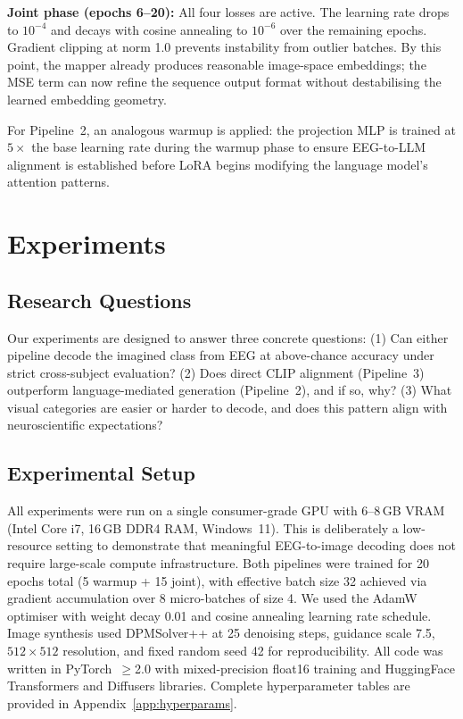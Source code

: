 \documentclass{article}
\begin{document}
\textbf{Joint phase (epochs 6--20):} All four losses are active. The learning rate drops to $10^{-4}$ and decays with cosine annealing to $10^{-6}$ over the remaining epochs. Gradient clipping at norm 1.0 prevents instability from outlier batches. By this point, the mapper already produces reasonable image-space embeddings; the MSE term can now refine the sequence output format without destabilising the learned embedding geometry.

For Pipeline~2, an analogous warmup is applied: the projection MLP is trained at $5\times$ the base learning rate during the warmup phase to ensure EEG-to-LLM alignment is established before LoRA begins modifying the language model's attention patterns.

\section{Experiments}
\label{sec:experiments}

\subsection{Research Questions}

Our experiments are designed to answer three concrete questions:
(1) Can either pipeline decode the imagined class from EEG at above-chance accuracy under strict cross-subject evaluation?
(2) Does direct CLIP alignment (Pipeline~3) outperform language-mediated generation (Pipeline~2), and if so, why?
(3) What visual categories are easier or harder to decode, and does this pattern align with neuroscientific expectations?

\subsection{Experimental Setup}

All experiments were run on a single consumer-grade GPU with 6--8\,GB VRAM (Intel Core i7, 16\,GB DDR4 RAM, Windows~11). This is deliberately a low-resource setting to demonstrate that meaningful EEG-to-image decoding does not require large-scale compute infrastructure. Both pipelines were trained for 20 epochs total (5 warmup + 15 joint), with effective batch size 32 achieved via gradient accumulation over 8 micro-batches of size 4. We used the AdamW optimiser with weight decay 0.01 and cosine annealing learning rate schedule. Image synthesis used DPMSolver++ at 25 denoising steps, guidance scale 7.5, $512 \times 512$ resolution, and fixed random seed 42 for reproducibility. All code was written in PyTorch~$\geq$2.0 with mixed-precision float16 training and HuggingFace Transformers and Diffusers libraries. Complete hyperparameter tables are provided in Appendix~\ref{app:hyperparams}.
\end{document}
